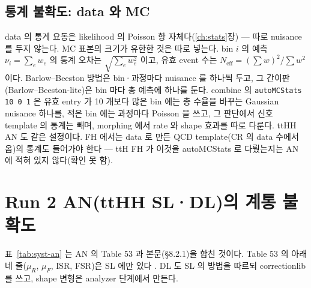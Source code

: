 \subsection{통계 불확도: data 와 MC}\label{sec:syst-stat}

data 의 통계 요동은 likelihood 의 Poisson 항 자체다(\ref{ch:stats}장) — 따로 nuisance 를 두지 않는다. MC 표본의 크기가 유한한 것은 따로 넣는다.
bin $i$ 의 예측 $\nu_i=\sum_e w_e$ 의 통계 오차는 $\sqrt{\sum_e w_e^2}$ 이고, 유효 event 수는 $N_{\mathrm{eff}}=(\sum w)^2/\sum w^2$ 이다.
Barlow–Beeston 방법은 bin·과정마다 nuisance 를 하나씩 두고, 그 간이판(Barlow–Beeston-lite)은 bin 마다 총 예측에 하나를 둔다.
combine 의 \texttt{autoMCStats 10 0 1} 은 유효 entry 가 10 개보다 많은 bin 에는 총 수율을 바꾸는 Gaussian nuisance 하나를, 적은 bin 에는 과정마다
Poisson 을 쓰고, 그 판단에서 신호 template 의 통계는 빼며, morphing 에서 rate 와 shape 효과를 따로 다룬다.
ttHH AN 도 같은 설정이다. FH 에서는 data 로 만든 QCD template(CR 의 data 수에서 옴)의 통계도 들어가야 한다 —
ttH FH 가 이것을 autoMCStats 로 다뤘는지는 AN 에 적혀 있지 않다(확인 못 함).

\section{Run 2 AN(ttHH SL·DL)의 계통 불확도}\label{sec:syst-an}

표~\ref{tab:syst-an} 는 AN 의 Table 53 과 본문(§8.2.1)을 합친 것이다. Table 53 의 아래 네 줄($\mu_R$, $\mu_F$, ISR, FSR)은 SL 에만 있다
. DL 도 SL 의 방법을 따르되 correctionlib 를 쓰고, shape 변형은 analyzer 단계에서 만든다.

